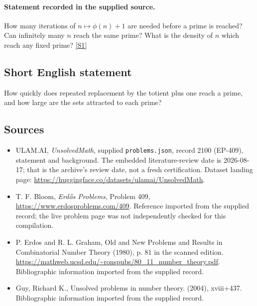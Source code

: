 \documentclass[11pt,a4paper]{article}
\newcommand{\sref}[2]{\hyperlink{source:#1:#2}{[S#2]}}
\begin{document}
\paragraph{Statement recorded in the supplied source.}
How many iterations of $n\mapsto \phi(n)+1$ are needed before a prime is reached? Can infinitely many $n$ reach the same prime? What is the density of $n$ which reach any fixed prime? \sref{2100}{1}

\subsection{Short English statement}

How quickly does repeated replacement by the totient plus one reach a prime, and how large are the sets attracted to each prime?

\subsection{Sources}

{\small

\begin{itemize}

\item[\hypertarget{source:2100:1}{S1}] ULAM.AI, \emph{UnsolvedMath}, supplied \texttt{problems.json}, record 2100 (EP-409), statement and background. The embedded literature-review date is 2026-08-17; that is the archive’s review date, not a fresh certification. Dataset landing page: \url{https://huggingface.co/datasets/ulamai/UnsolvedMath}.

\item[\hypertarget{source:2100:2}{S2}] T. F. Bloom, \emph{Erdős Problems}, Problem 409, \url{https://www.erdosproblems.com/409}. Reference imported from the supplied record; the live problem page was not independently checked for this compilation.

\item[\hypertarget{source:2100:3}{S3}] P. Erdos and R. L. Graham, Old and New Problems and Results in Combinatorial Number Theory (1980), p. 81 in the scanned edition. \url{https://mathweb.ucsd.edu/~ronspubs/80_11_number_theory.pdf}. Bibliographic information imported from the supplied record.

\item[\hypertarget{source:2100:4}{S4}] Guy, Richard K., Unsolved problems in number theory. (2004), xviii+437. Bibliographic information imported from the supplied record.

\end{itemize}

}

\label{end:2100}
\end{document}

